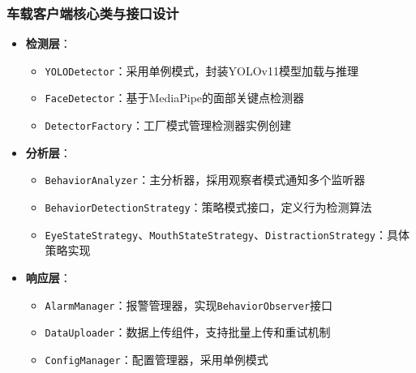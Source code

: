 \documentclass[a4paper,12pt]{article}
\begin{document}
\subsubsection{车载客户端核心类与接口设计}
\begin{itemize}
  \item \textbf{检测层}：
    \begin{itemize}
      \item \texttt{YOLODetector}：采用单例模式，封装YOLOv11模型加载与推理
      \item \texttt{FaceDetector}：基于MediaPipe的面部关键点检测器
      \item \texttt{DetectorFactory}：工厂模式管理检测器实例创建
    \end{itemize}
  \item \textbf{分析层}：
    \begin{itemize}
      \item \texttt{BehaviorAnalyzer}：主分析器，採用观察者模式通知多个监听器
      \item \texttt{BehaviorDetectionStrategy}：策略模式接口，定义行为检测算法
      \item \texttt{EyeStateStrategy}、\texttt{MouthStateStrategy}、\texttt{DistractionStrategy}：具体策略实现
    \end{itemize}
  \item \textbf{响应层}：
    \begin{itemize}
      \item \texttt{AlarmManager}：报警管理器，实现\texttt{BehaviorObserver}接口
      \item \texttt{DataUploader}：数据上传组件，支持批量上传和重试机制
      \item \texttt{ConfigManager}：配置管理器，采用单例模式
    \end{itemize}
\end{itemize}
\end{document}
